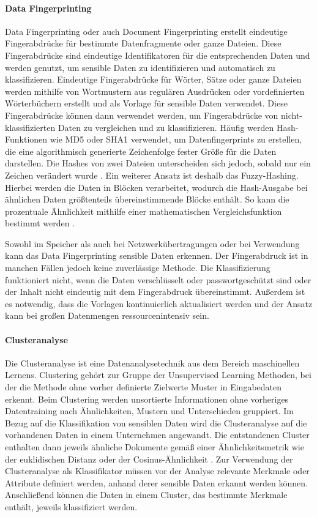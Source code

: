 \paragraph{Data Fingerprinting}
Data Fingerprinting oder auch Document Fingerprinting erstellt eindeutige Fingerabdrücke für bestimmte Datenfragmente oder ganze Dateien. Diese Fingerabdrücke sind eindeutige Identifikatoren für die entsprechenden Daten und werden genutzt, um sensible Daten zu identifizieren und automatisch zu klassifizieren. Eindeutige Fingerabdrücke für Wörter, Sätze oder ganze Dateien werden mithilfe von Wortmustern aus regulären Ausdrücken oder vordefinierten Wörterbüchern erstellt und als Vorlage für sensible Daten verwendet. Diese Fingerabdrücke können dann verwendet werden, um Fingerabdrücke von nicht-klassifizierten Daten zu vergleichen und zu klassifizieren.
Häufig werden Hash-Funktionen wie MD5 oder SHA1 verwendet, um Datenfingerprints zu erstellen, die eine algorithmisch generierte Zeichenfolge fester Größe für die Daten darstellen. Die Hashes von zwei Dateien unterscheiden sich jedoch, sobald nur ein Zeichen verändert wurde \cite{Alneyadi.2016}. Ein weiterer Ansatz ist deshalb das \glqq Fuzzy-Hashing\grqq. Hierbei werden die Daten in Blöcken verarbeitet, wodurch die Hash-Ausgabe bei ähnlichen Daten größtenteils übereinstimmende Blöcke enthält. So kann die prozentuale Ähnlichkeit mithilfe einer mathematischen Vergleichsfunktion bestimmt werden \cite{Shu.2015}.

Sowohl im Speicher als auch bei Netzwerkübertragungen oder bei Verwendung kann das Data Fingerprinting sensible Daten erkennen. Der Fingerabdruck ist in manchen Fällen jedoch keine zuverlässige Methode. Die Klassifizierung funktioniert nicht, wenn die Daten verschlüsselt oder passwortgeschützt sind oder der Inhalt nicht eindeutig mit dem Fingerabdruck übereinstimmt. Außerdem ist es notwendig, dass die Vorlagen kontinuierlich aktualisiert werden und der Ansatz kann bei großen Datenmengen ressourcenintensiv sein.

\paragraph{Clusteranalyse}
Die Clusteranalyse ist eine Datenanalysetechnik aus dem Bereich maschinellen Lernens. Clustering gehört zur Gruppe der Unsupervised Learning Methoden, bei der die Methode ohne vorher definierte Zielwerte Muster in Eingabedaten erkennt. Beim Clustering werden unsortierte Informationen ohne vorheriges Datentraining nach Ähnlichkeiten, Mustern und Unterschieden gruppiert. Im Bezug auf die Klassifikation von sensiblen Daten wird die Clusteranalyse auf die vorhandenen Daten in einem Unternehmen angewandt. Die entstandenen Cluster enthalten dann jeweils ähnliche Dokumente gemäß einer Ähnlichkeitsmetrik wie der euklidischen Distanz oder der Cosinus-Ähnlichkeit \cite{Suyal.2014}.
Zur Verwendung der Clusteranalyse als Klassifikator müssen vor der Analyse relevante Merkmale oder Attribute definiert werden, anhand derer sensible Daten erkannt werden können. Anschließend können die Daten in einem Cluster, das bestimmte Merkmale enthält, jeweils klassifiziert werden.

